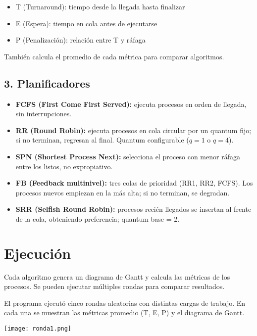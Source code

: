 \documentclass[12pt]{article}
\begin{document}
\begin{itemize}
    \item T (Turnaround): tiempo desde la llegada hasta finalizar
    \item E (Espera): tiempo en cola antes de ejecutarse
    \item P (Penalización): relación entre T y ráfaga
\end{itemize}

También calcula el promedio de cada métrica para comparar algoritmos.

\subsection*{3. Planificadores}

\begin{itemize}
    \item \textbf{FCFS (First Come First Served):} ejecuta procesos en orden de llegada, sin interrupciones.
    \item \textbf{RR (Round Robin):} ejecuta procesos en cola circular por un quantum fijo; si no terminan, regresan al final. Quantum configurable (\(q=1\) o \(q=4\)).
    \item \textbf{SPN (Shortest Process Next):} selecciona el proceso con menor ráfaga entre los listos, no expropiativo.
    \item \textbf{FB (Feedback multinivel):} tres colas de prioridad (RR1, RR2, FCFS). Los procesos nuevos empiezan en la más alta; si no terminan, se degradan.
    \item \textbf{SRR (Selfish Round Robin):} procesos recién llegados se insertan al frente de la cola, obteniendo preferencia; quantum base = 2.
\end{itemize}

\section*{Ejecución}

Cada algoritmo genera un diagrama de Gantt y calcula las métricas de los procesos. Se pueden ejecutar múltiples rondas para comparar resultados.  

El programa ejecutó cinco rondas aleatorias con distintas cargas de trabajo. En cada una se muestran las métricas promedio (T, E, P) y el diagrama de Gantt.  
\begin{center}
    \texttt{[image: ronda1.png]}
\end{center}
\end{document}
